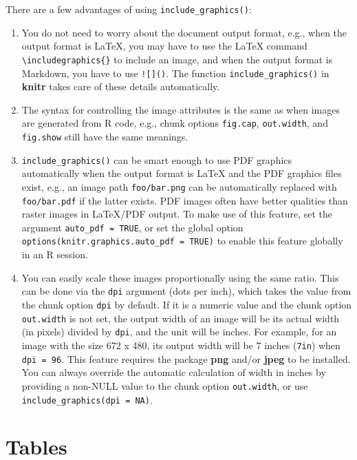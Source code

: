 \documentclass[
  12pt,
]{krantz}
\providecommand{\tightlist}{%
  \setlength{\itemsep}{0pt}\setlength{\parskip}{0pt}}
\theoremstyle{definition}
\theoremstyle{definition}
\theoremstyle{definition}
\theoremstyle{definition}
\theoremstyle{remark}
\begin{document}
There are a few advantages of using \texttt{include\_graphics()}:

\begin{enumerate}
\def\labelenumi{\arabic{enumi}.}
\tightlist
\item
  You do not need to worry about the document output format, e.g., when the output format is LaTeX, you may have to use the LaTeX command \texttt{\textbackslash{}includegraphics\{\}} to include an image, and when the output format is Markdown, you have to use \texttt{!{[}{]}()}. The function \texttt{include\_graphics()} in \textbf{knitr} takes care of these details automatically.
\item
  The syntax for controlling the image attributes is the same as when images are generated from R code, e.g., chunk options \texttt{fig.cap}, \texttt{out.width}, and \texttt{fig.show} still have the same meanings.
\item
  \texttt{include\_graphics()} can be smart enough to use PDF graphics automatically when the output format is LaTeX and the PDF graphics files exist, e.g., an image path \texttt{foo/bar.png} can be automatically replaced with \texttt{foo/bar.pdf} if the latter exists. PDF images often have better qualities than raster images in LaTeX/PDF output. To make use of this feature, set the argument \texttt{auto\_pdf\ =\ TRUE}, or set the global option \texttt{options(knitr.graphics.auto\_pdf\ =\ TRUE)} to enable this feature globally in an R session.
\item
  You can easily scale these images proportionally using the same ratio. This can be done via the \texttt{dpi} argument (dots per inch), which takes the value from the chunk option \texttt{dpi} by default. If it is a numeric value and the chunk option \texttt{out.width} is not set, the output width of an image will be its actual width (in pixels) divided by \texttt{dpi}, and the unit will be inches. For example, for an image with the size 672 x 480, its output width will be 7 inches (\texttt{7in}) when \texttt{dpi\ =\ 96}. This feature requires the package \textbf{png} and/or \textbf{jpeg} to be installed. You can always override the automatic calculation of width in inches by providing a non-NULL value to the chunk option \texttt{out.width}, or use \texttt{include\_graphics(dpi\ =\ NA)}.
\end{enumerate}

\section{Tables}\label{tables}
\end{document}
